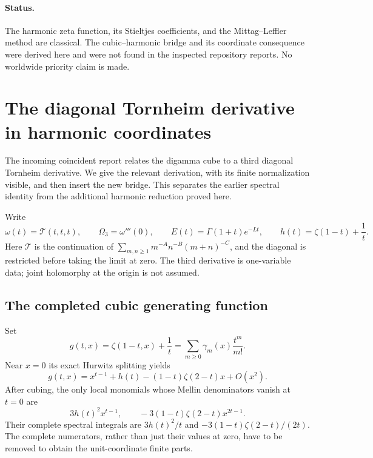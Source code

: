 \documentclass[11pt]{article}
\numberwithin{equation}{section}
\theoremstyle{definition}
\theoremstyle{remark}
\newcommand{\T}{\mathcal T}
\begin{document}
\paragraph{Status.}
The harmonic zeta function, its Stieltjes coefficients, and the
Mittag--Leffler method are classical.  The cubic--harmonic bridge and
its coordinate consequence were derived here and were not found in the
inspected repository reports.  No worldwide priority claim is made.


\section{The diagonal Tornheim derivative in harmonic coordinates}
\label{sec:diagonal}

The incoming coincident report relates the digamma cube to a third
diagonal Tornheim derivative. We give the relevant derivation, with
its finite normalization visible, and then insert the new bridge.
This separates the earlier spectral identity from the additional
harmonic reduction proved here.

Write
\[
 \omega(t)=\T(t,t,t),\qquad \Omega_3=\omega'''(0),\qquad
 E(t)=\Gamma(1+t)e^{-Lt},\qquad
 h(t)=\zeta(1-t)+\frac1t.
\]
Here $\T$ is the continuation of
$\sum_{m,n\ge1}m^{-A}n^{-B}(m+n)^{-C}$, and the diagonal is
restricted before taking the limit at zero. The third derivative is
one-variable data; joint holomorphy at the origin is not assumed.

\subsection{The completed cubic generating function}

Set
\[
 g(t,x)=\zeta(1-t,x)+\frac1t
       =\sum_{m\ge0}\gamma_m(x)\frac{t^m}{m!}.
\]
Near $x=0$ its exact Hurwitz splitting yields
\begin{equation}\label{diag:local}
 g(t,x)=x^{t-1}+h(t)-(1-t)\zeta(2-t)x+O(x^2).
\end{equation}
After cubing, the only local monomials whose Mellin denominators
vanish at $t=0$ are
\[
 3h(t)^2x^{t-1},\qquad
 -3(1-t)\zeta(2-t)x^{2t-1}.
\]
Their complete spectral integrals are $3h(t)^2/t$ and
$-3(1-t)\zeta(2-t)/(2t)$. The complete numerators, rather than
just their values at zero, have to be removed to obtain the
unit-coordinate finite parts.
\end{document}

